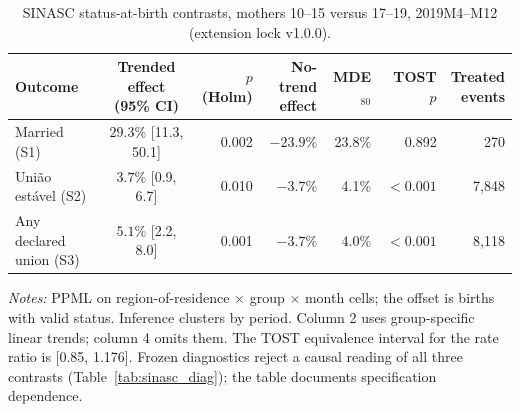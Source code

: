 \begin{table}[!htbp]
\centering
\caption{SINASC status-at-birth contrasts, mothers 10--15 versus 17--19,
2019M4--M12 (extension lock v1.0.0).}
\label{tab:sinasc_status}
\begingroup\scriptsize
\begin{tabular}{@{}lcrrrrr@{}}
\toprule
Outcome & Trended effect (95\% CI) & $p$ (Holm) &
\shortstack{No-trend\\effect} & MDE$_{80}$ & TOST $p$ &
\shortstack{Treated\\events} \\
\midrule
Married (S1) & $29.3\%$ [11.3, 50.1] & 0.002 & $-23.9\%$ & 23.8\% & 0.892 & 270 \\
Uni\~ao est\'avel (S2) & $3.7\%$ [0.9, 6.7] & 0.010 & $-3.7\%$ & 4.1\% & $<0.001$ & 7,848 \\
Any declared union (S3) & $5.1\%$ [2.2, 8.0] & 0.001 & $-3.7\%$ & 4.0\% & $<0.001$ & 8,118 \\
\bottomrule
\end{tabular}
\par\smallskip
\begin{minipage}{0.96\linewidth}\footnotesize
\emph{Notes:} PPML on region-of-residence $\times$ group $\times$ month cells;
the offset is births with valid status. Inference clusters by period. Column 2 uses
group-specific linear trends; column 4 omits them. The TOST equivalence interval for
the rate ratio is [0.85, 1.176]. Frozen diagnostics reject a causal reading of all three
contrasts (Table~\ref{tab:sinasc_diag}); the table documents specification dependence.
\end{minipage}
\endgroup
\end{table}
